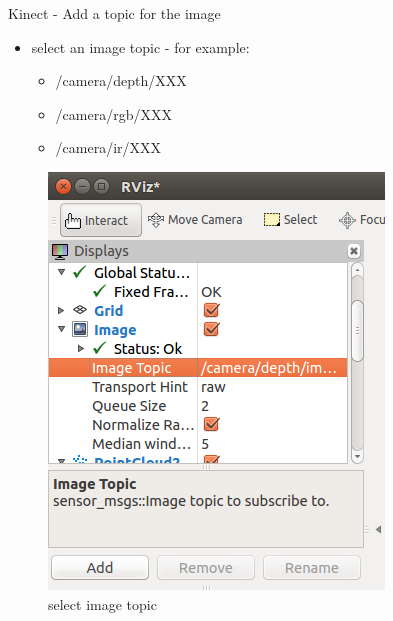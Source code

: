 \documentclass{beamer}
\begin{document}
\begin{frame}{Kinect - Add a topic for the image}	

	\begin{itemize}
		\item select an image topic - for example: \\
			 
			\begin{itemize}
				\item /camera/depth/XXX
				\item /camera/rgb/XXX
				\item /camera/ir/XXX
			\end{itemize}
			
	\end{itemize}

	\begin{figure}[H]
		\includegraphics[scale=0.3]{./images/Add_Image_Topic.png}
		\caption{select image topic}
		\label{fig:ros_image_topic}
	\end{figure}
		
\end{frame}

\end{document}
